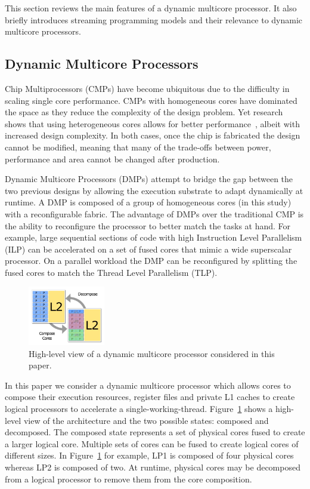 This section reviews the main features of a dynamic multicore processor.
It also  briefly introduces streaming programming models and their relevance to dynamic multicore processors.

\subsection{Dynamic Multicore Processors}


Chip Multiprocessors (CMPs) have become ubiquitous due to the difficulty in scaling single core performance.
CMPs with homogeneous cores have dominated the space as they reduce the complexity of the design problem.
Yet research shows that using heterogeneous cores allows for better performance~\cite{suleman2009asymmetric}, albeit with increased design complexity. 
In both cases, once the chip is fabricated the design cannot be modified, meaning that many of the trade-offs between power, performance and area cannot be changed after production.

Dynamic Multicore Processors (DMPs) attempt to bridge the gap between the two previous designs by allowing the execution substrate to adapt dynamically at runtime.
A DMP is composed of a group of homogeneous cores (in this study) with a reconfigurable fabric.
The advantage of DMPs over the traditional CMP is the ability to reconfigure the processor to better match the tasks at hand.
For example, large sequential sections of code with high Instruction Level Parallelism (ILP) can be accelerated on a set of fused cores that mimic a wide superscalar processor.
On a parallel workload the DMP can be reconfigured by splitting the fused cores to match the Thread Level Parallelism (TLP).

\begin{figure}[h]
    \centering
    \includegraphics[width=0.3\textwidth]{streamit-paper/graphics/dmcgraph.pdf}
    \caption{High-level view of a dynamic multicore processor considered in this paper.}
    \label{fig:dynmulticore}
\end{figure}

In this paper we consider a dynamic multicore processor which allows cores to compose their execution resources, register files and private L1 caches to create logical processors to accelerate a single-working-thread.
Figure~\ref{fig:dynmulticore} shows a high-level view of the architecture and the two possible states: composed and decomposed.
The composed state represents a set of physical cores fused to create a larger logical core.
Multiple sets of cores can be fused to create logical cores of different sizes.
In Figure~\ref{fig:dynmulticore} for example, LP1 is composed of four physical cores whereas LP2 is composed of two.
At runtime, physical cores may be decomposed from a logical processor to remove them from the core composition.

